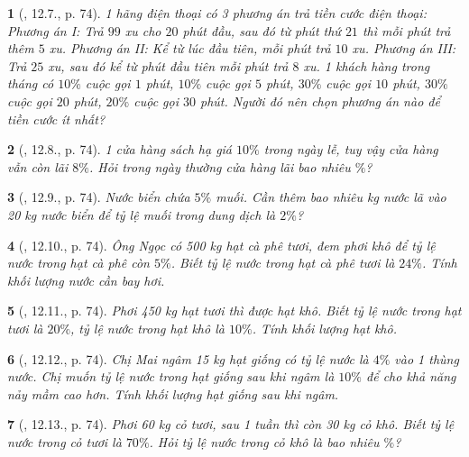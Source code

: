 \documentclass{article}
\newtheorem{baitoan}{}
\begin{document}
\begin{baitoan}[\cite{TLCT_THCS_Toan_6_so_hoc}, 12.7., p. 74]
	1 hãng điện thoại có 3 phương án trả tiền cước điện thoại: Phương án I: Trả $99$ xu cho $20$ phút đầu, sau đó từ phút thứ $21$ thì mỗi phút trả thêm $5$ xu. Phương án II: Kể từ lúc đầu tiên, mỗi phút trả $10$ xu. Phương án III: Trả $25$ xu, sau đó kể từ phút đầu tiên mỗi phút trả $8$ xu. 1 khách hàng trong tháng có $10\%$ cuộc gọi $1$ phút, $10\%$ cuộc gọi $5$ phút, $30\%$ cuộc gọi $10$ phút, $30\%$ cuộc gọi $20$ phút, $20\%$ cuộc gọi $30$ phút. Người đó nên chọn phương án nào để tiền cước ít nhất?
\end{baitoan}

\begin{baitoan}[\cite{TLCT_THCS_Toan_6_so_hoc}, 12.8., p. 74]
	1 cửa hàng sách hạ giá $10\%$ trong ngày lễ, tuy vậy cửa hàng vẫn còn lãi $8\%$. Hỏi trong ngày thường cửa hàng lãi bao nhiêu $\%$?
\end{baitoan}

\begin{baitoan}[\cite{TLCT_THCS_Toan_6_so_hoc}, 12.9., p. 74]
	Nước biển chứa $5\%$ muối. Cần thêm bao nhiêu {\rm kg} nước lã vào {\rm20 kg} nước biển để tỷ lệ muối trong dung dịch là $2\%$?
\end{baitoan}

\begin{baitoan}[\cite{TLCT_THCS_Toan_6_so_hoc}, 12.10., p. 74]
	Ông Ngọc có {\rm500 kg} hạt cà phê tươi, đem phơi khô để tỷ lệ nước trong hạt cà phê còn $5\%$. Biết tỷ lệ nước trong hạt cà phê tươi là $24\%$. Tính khối lượng nước cần bay hơi.
\end{baitoan}

\begin{baitoan}[\cite{TLCT_THCS_Toan_6_so_hoc}, 12.11., p. 74]
	Phơi {\rm450 kg} hạt tươi thì được hạt khô. Biết tỷ lệ nước trong hạt tươi là $20\%$, tỷ lệ nước trong hạt khô là $10\%$. Tính khối lượng hạt khô.
\end{baitoan}

\begin{baitoan}[\cite{TLCT_THCS_Toan_6_so_hoc}, 12.12., p. 74]
	Chị Mai ngâm {\rm15 kg} hạt giống có tỷ lệ nước là $4\%$ vào 1 thùng nước. Chị muốn tỷ lệ nước trong hạt giống sau khi ngâm là $10\%$ để cho khả năng nảy mầm cao hơn. Tính khối lượng hạt giống sau khi ngâm.
\end{baitoan}

\begin{baitoan}[\cite{TLCT_THCS_Toan_6_so_hoc}, 12.13., p. 74]
	Phơi {\rm60 kg} cỏ tươi, sau 1 tuần thì còn {\rm30 kg} cỏ khô. Biết tỷ lệ nước trong cỏ tươi là $70\%$. Hỏi tỷ lệ nước trong cỏ khô là bao nhiêu $\%$?
\end{baitoan}
\end{document}
